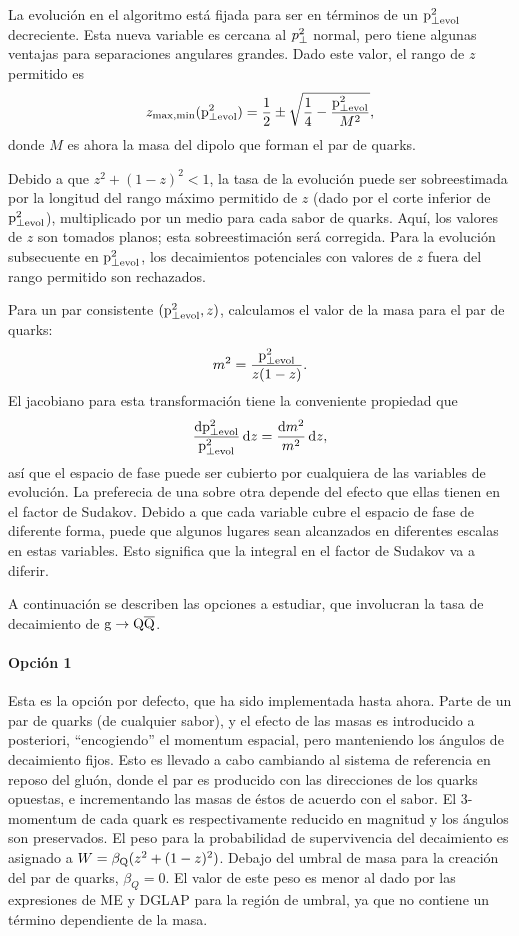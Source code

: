 La evolución en el algoritmo está fijada para ser en términos de un ${\mathrm p}^2_{\perp\mathrm{evol}}$ decreciente. Esta nueva variable es cercana al $p^2_{\perp}$ normal, pero tiene algunas ventajas para separaciones angulares grandes. Dado este valor, el rango de $z$ permitido es
\begin{equation}
z_{\mathrm{max,min}}({\mathrm p}^2_{\perp\mathrm{evol}}) = \frac{1}{2} \pm \sqrt{ \frac{1}{4}
 - \frac{{\mathrm p}^2_{\perp\mathrm{evol}}}{M^2}},
\end{equation}
donde $M$ es ahora la masa del dipolo que forman el par de quarks.

Debido a que $z^2+(1-z)^2<1$, la tasa de la evolución puede ser sobreestimada por la longitud del rango máximo permitido de $z$ (dado por el corte inferior de ${\mathrm p}^2_{\perp\mathrm{evol}}$), multiplicado por un medio para cada sabor de quarks. Aquí, los valores de $z$ son tomados planos; esta sobreestimación será corregida. Para la evolución subsecuente en ${\mathrm p}^2_{\perp\mathrm{evol}}$, los decaimientos potenciales con valores de $z$ fuera del rango permitido son rechazados.

Para un par consistente $({\mathrm p}^2_{\perp\mathrm{evol}},z)$, calculamos el valor de la masa para el par de quarks:
\begin{equation}
m^2 = \frac{{\mathrm p}^2_{\perp\mathrm{evol}}}{z(1-z)}.
\end{equation}
El jacobiano para esta transformación tiene la conveniente propiedad que
\begin{equation}
\frac{{\mathrm d}{\mathrm p}^2_{\perp\mathrm{evol}}}{{\mathrm p}^2_{\perp\mathrm{evol}}} \, {\mathrm d} z = \frac{{\mathrm d} m^2}{m^2} \, {\mathrm d} z,
\label{jacobian}
\end{equation}
así que el espacio de fase puede ser cubierto por cualquiera de las variables de evolución. La preferecia de una sobre otra depende del efecto que ellas tienen en el factor de Sudakov. Debido a que cada variable cubre el espacio de fase de diferente forma, puede que algunos lugares sean alcanzados en diferentes escalas en estas variables. Esto significa que la integral en el factor de Sudakov va a diferir.

A continuación se describen las opciones a estudiar, que involucran la tasa de decaimiento de ${\mathrm g}\to{\mathrm Q}\overline{\mathrm Q}$.

\paragraph{Opción 1}

Esta es la opción por defecto, que ha sido implementada hasta ahora. Parte de un par de quarks (de cualquier sabor), y el efecto de las masas es introducido a posteriori, ``encogiendo'' el momentum espacial, pero manteniendo los ángulos de decaimiento fijos. Esto es llevado a cabo cambiando al sistema de referencia en reposo del gluón, donde el par es producido con las direcciones de los quarks opuestas, e incrementando las masas de éstos de acuerdo con el sabor. El 3-momentum de cada quark es respectivamente reducido en magnitud y los ángulos son preservados. El peso para la probabilidad de supervivencia del decaimiento es asignado a $W=\beta_{\mathrm Q}(z^2+(1-z)^2)$. Debajo del umbral de masa para la creación del par de quarks, $\beta_Q=0$. El valor de este peso es menor al dado por las expresiones de ME y DGLAP para la región de umbral, ya que no contiene un término dependiente de la masa.

